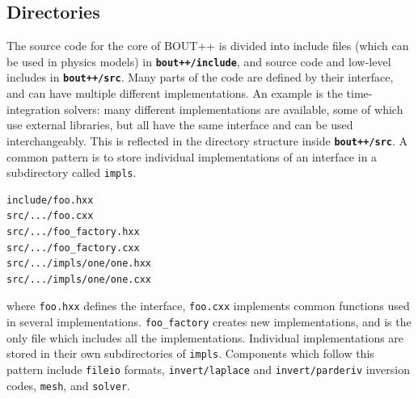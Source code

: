\documentclass[12pt]{article}
\newcommand{\file}[1]{\texttt{\bf #1}}
\begin{document}
\subsection{Directories}

The source code for the core of BOUT++ is divided into
include files (which can be used in physics models) in 
\file{bout++/include}, and source code and low-level includes
in \file{bout++/src}. Many parts of the code are defined by their
interface, and can have multiple different implementations. An example
is the time-integration solvers: many different implementations are available,
some of which use external libraries, but all have the same interface and can
be used interchangeably. This is reflected in the directory structure
inside \file{bout++/src}. A common pattern is
to store individual implementations of an interface
in a subdirectory called \texttt{impls}. 
\begin{verbatim}
include/foo.hxx
src/.../foo.cxx
src/.../foo_factory.hxx
src/.../foo_factory.cxx
src/.../impls/one/one.hxx
src/.../impls/one/one.cxx
\end{verbatim}
where \texttt{foo.hxx} defines the interface, \texttt{foo.cxx} implements common functions
used in several implementations. \texttt{foo\_factory} creates new implementations, and is
the only file which includes all the implementations. Individual implementations
are stored in their own subdirectories of \texttt{impls}. Components which follow this pattern
include \texttt{fileio} formats, \texttt{invert/laplace} and \texttt{invert/parderiv} 
inversion codes, \texttt{mesh}, and \texttt{solver}.
\end{document}
